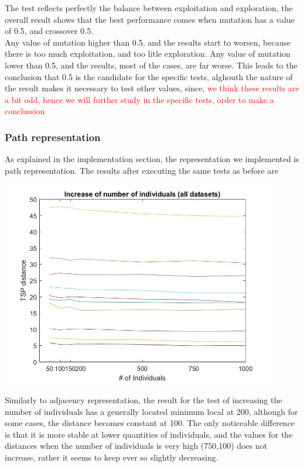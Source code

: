 The test reflects perfectly the balance between exploitation and
exploration, the overall result shows that the best performance comes when
mutation has a value of 0.5, and crossover 0.5.\\
Any value of mutation higher than 0.5, and the results start to worsen, because
there is too much exploitation, and too litle exploration. Any value of mutation
lower than 0.5, and the results, most of the cases, are far worse. This leads to
the conclusion that 0.5 is the candidate for the specific tests, alghouth
the nature of the result makes it necessary to test other values, since,
\textcolor{red}{we think these results are a bit odd, hence we will further
study in the specific tests, order to make a conclussion}


\subsubsection{Path representation}

As explained in the implementation section, the representation we
implemented is path representation. The results after executing the same
tests as before are

\begin{center}
\includegraphics[width=12cm]{img/order_crossover/numberIndiv.jpg}
\end{center}

Similarly to adjacency representation, the result for the test
of increasing the number of individuals has a generally located minimum local at
200, although for some cases, the distance becomes constant at 100. The only
noticeable difference is that it is more stable at lower quantities of
individuals, and the values for the distances when the number of
individuals is very high (750,100) does not increase, rather it seems to keep
ever so slightly decreasing.

